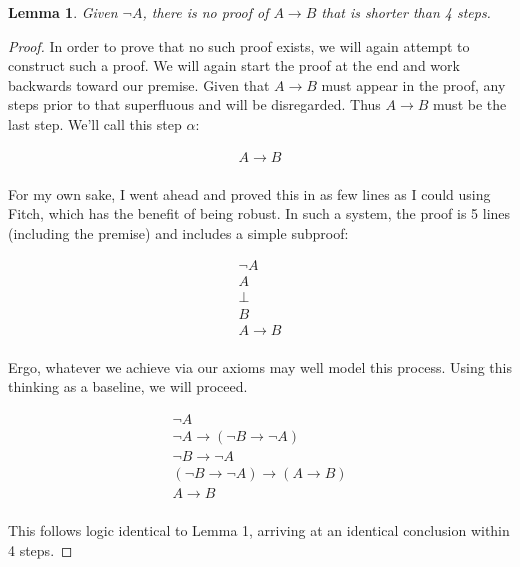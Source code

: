 \documentclass{article}
\newtheorem{lem}{Lemma}
\begin{document}
\begin{lem}
	Given $\neg A$, there is no proof of $A \rightarrow B$ that is shorter than 4 steps.
\end{lem}
\begin{proof}
	In order to prove that no such proof exists, we will again attempt to construct such a proof.
	We will again start the proof at the end and work backwards toward our premise. Given that $A \rightarrow B$ must appear in the proof, any steps prior to that superfluous and will be disregarded. Thus $A \rightarrow B$ must be the last step. We'll call this step $\alpha$:
	
	\begin{gather*}
	A \rightarrow B \tag*{$(\alpha)$} \\
	\end{gather*}
	
	For my own sake, I went ahead and proved this in as few lines as I could using Fitch, which has the benefit of being robust. In such a system, the proof is 5 lines (including the premise) and includes a simple subproof:
	
	\begin{gather*}
	\neg A \tag*{Premise (1)} \\
	A \tag*{Assumed (2)} \\
	\bot \tag*{$\bot$ Introduction 1,2 (3)} \\
	B \tag*{$\bot$ Elimination 3 (4)} \\
	A \rightarrow B \tag*{$\rightarrow$ Introduction 2-4 (5)} \\
	\end{gather*}
	
	Ergo, whatever we achieve via our axioms may well model this process. Using this thinking as a baseline, we will proceed.
	
	\begin{gather*}
	\neg A \tag*{Premise ($\phi$)} \\
	\neg A \rightarrow (\neg B \rightarrow \neg A) \tag*{L.S.1 $\phi$ ($\delta$)} \\
	\neg B \rightarrow \neg A \tag*{MP $\phi, \delta$ ($\gamma$)} \\
	(\neg B \rightarrow \neg A) \rightarrow (A \rightarrow B) \tag*{L.S.3 $\gamma$ ($\beta$)} \\
	A \rightarrow B \tag*{MP $\gamma, \beta$ ($\alpha$)} \\
	\end{gather*}
	
	This follows logic identical to Lemma 1, arriving at an identical conclusion within 4 steps.
\end{proof}
\end{document}
